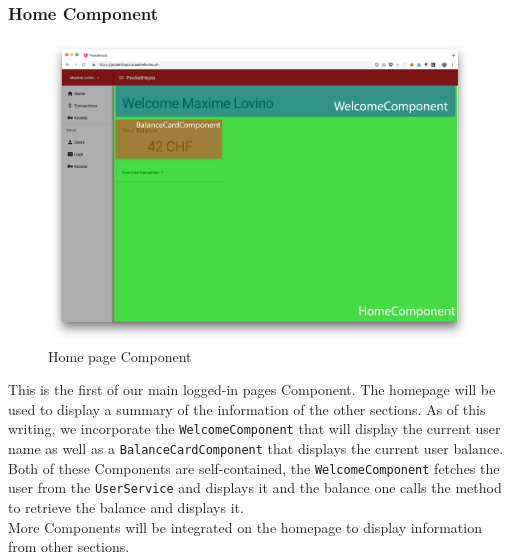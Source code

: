 \documentclass[twoside, openright,11pt,a4paper]{book}
\begin{document}
\subsubsection{Home Component}
\label{home_component_impl}
\begin{figure}[H]
\begin{center}
	\includegraphics[width=\textwidth]{assets/screens/angular/homepage}
	\caption{Home page Component}
			\label{home_screen}
\end{center}
\end{figure}
This is the first of our main logged-in pages Component. The homepage will be used to display a summary of the information of the other sections. As of this writing, we incorporate the \verb+WelcomeComponent+ that will display the current user name as well as a \verb+BalanceCardComponent+ that displays the current user balance. Both of these Components are self-contained, the \verb+WelcomeComponent+ fetches the user from the \verb+UserService+ and displays it and the balance one calls the method to retrieve the balance and displays it. \\

More Components will be integrated on the homepage to display information from other sections.
\end{document}
